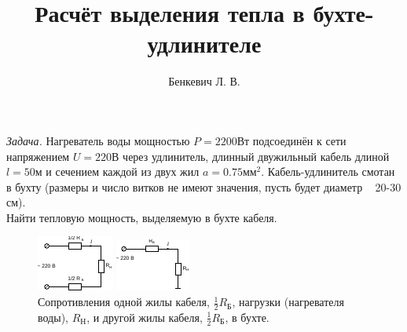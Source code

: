 \documentclass[letterpaper,twoside,12pt]{article}
\title{Расчёт выделения тепла в бухте-удлинителе}
\author{Бенкевич Л. В.}
\begin{document}
\maketitle 

\emph{Задача.} Нагреватель воды мощностью $P = 2200 \text{Вт}$ подсоединён к сети напряжением $U = 220 \text{В}$ через удлинитель, длинный двужильный кабель длиной $l = 50 \text{м}$ и сечением каждой из двух жил $a = 0.75 \text{мм}^2$. Кабель-удлинитель смотан в бухту (размеры и число витков не имеют значения, пусть будет диаметр ~ 20-30 см). \\

Найти тепловую мощность, выделяемую в бухте кабеля.


\begin{figure}[h]
    \centering
    \begin{minipage}{0.45\textwidth}
        \centering
        \includegraphics[width=\linewidth]{circuit_Rb_Rn_Rb.pdf}
        \caption{Сопротивления одной жилы кабеля, $\frac{1}{2} R_\text{Б}$, нагрузки (нагревателя воды), $R_\text{Н}$, и другой жилы кабеля, $\frac{1}{2} R_\text{Б}$,  в бухте.}
        \label{rb_rn_rb}
    \end{minipage}
    \hfill
    \begin{minipage}{0.45\textwidth}
        \centering
        \includegraphics[width=\linewidth]{circuit_Rb_Rn.pdf}

\end{minipage}
\end{figure}
\end{document}
